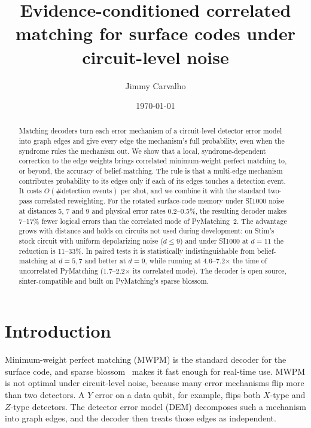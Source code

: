 \documentclass[aps,pra,twocolumn,superscriptaddress,nofootinbib]{revtex4-2}
\begin{document}
\title{Evidence-conditioned correlated matching for surface codes under circuit-level noise}

\author{Jimmy Carvalho}%
\date{\today}

\begin{abstract}
Matching decoders turn each error mechanism of a circuit-level detector error
model into graph edges and give every edge the mechanism's full probability,
even when the syndrome rules the mechanism out. We show that a local,
syndrome-dependent correction to the edge weights brings correlated
minimum-weight perfect matching to, or beyond, the accuracy of belief-matching. The rule is that a multi-edge mechanism contributes
probability to its edges only if each of its edges touches a detection event.
It costs $O(\#\text{detection events})$ per shot, and we combine it with the
standard two-pass correlated reweighting. For the rotated surface-code memory
under SI1000 noise at distances 5, 7 and 9 and physical error rates
0.2--0.5\%, the resulting decoder makes 7--17\% fewer logical errors than the
correlated mode of PyMatching~2. The advantage grows with distance and holds on circuits not used during development: on Stim's stock
circuit with uniform depolarizing noise ($d\le9$) and under SI1000 at $d=11$ the reduction is 11--33\%. In paired
tests it is statistically indistinguishable from belief-matching at $d=5,7$
and better at $d=9$, while running at 4.6--7.2$\times$ the time of
uncorrelated PyMatching (1.7--2.2$\times$ its correlated mode). The decoder
is open source, sinter-compatible and built on PyMatching's sparse blossom.
\end{abstract}

\maketitle

\section{Introduction}

Minimum-weight perfect matching (MWPM) is the standard decoder for the
surface code, and sparse blossom~\cite{higgott2023sparse} makes it fast
enough for real-time use. MWPM is not optimal under circuit-level noise,
because many error mechanisms flip more than two detectors. A $Y$ error on a
data qubit, for example, flips both $X$-type and $Z$-type detectors. The
detector error model (DEM) decomposes such a mechanism into graph edges, and
the decoder then treats those edges as independent.
\end{document}
